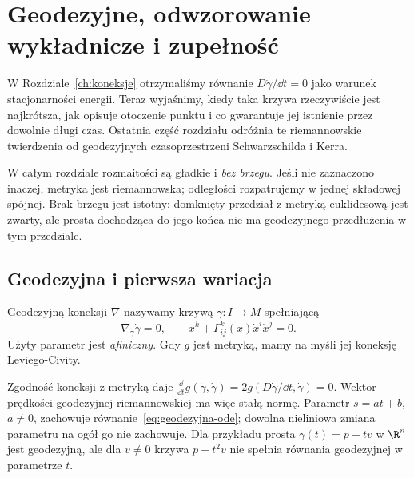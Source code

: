 \chapter{Geodezyjne, odwzorowanie wykładnicze i zupełność}
\label{ch:geodezyjne-exp}

W Rozdziale~\ref{ch:koneksje} otrzymaliśmy równanie
$D\dot\gamma/\dd t=0$ jako warunek stacjonarności
energii. Teraz wyjaśnimy, kiedy taka krzywa
rzeczywiście jest najkrótsza, jak opisuje otoczenie
punktu i co gwarantuje jej istnienie przez dowolnie
długi czas. Ostatnia część rozdziału odróżnia te
riemannowskie twierdzenia od geodezyjnych
czasoprzestrzeni Schwarzschilda i Kerra.

W całym rozdziale rozmaitości są gładkie i \emph{bez brzegu}.
Jeśli nie zaznaczono inaczej, metryka jest riemannowska;
odległości rozpatrujemy w jednej składowej spójnej.
Brak brzegu jest istotny: domknięty przedział z metryką
euklidesową jest zwarty, ale prosta dochodząca do jego
końca nie ma geodezyjnego przedłużenia w tym przedziale.

\section{Geodezyjna i pierwsza wariacja}
\label{sec:geodezyjna-pierwsza-wariacja}

\begin{definicja}[Geodezyjna]
\label{def:geodezyjna}
Geodezyjną koneksji $\nabla$ nazywamy krzywą
$\gamma:I\to M$ spełniającą
\begin{equation}\label{eq:geodezyjna-ode}
 \nabla_{\dot\gamma}\dot\gamma=0,
 \qquad
 \ddot x^k+\Gamma^k_{ij}(x)\dot x^i\dot x^j=0.
\end{equation}
Użyty parametr jest \emph{afiniczny}.
Gdy $g$ jest metryką, mamy na myśli jej
koneksję Leviego-Civity.
\end{definicja}

Zgodność koneksji z metryką daje
$\frac{\dd}{\dd t}g(\dot\gamma,\dot\gamma)
=2g(D\dot\gamma/\dd t,\dot\gamma)=0$.
Wektor prędkości geodezyjnej riemannowskiej ma więc stałą
normę. Parametr $s=at+b$, $a\ne0$,
zachowuje równanie~\eqref{eq:geodezyjna-ode};
dowolna nieliniowa zmiana parametru na ogół
go nie zachowuje. Dla przykładu prosta
$\gamma(t)=p+tv$ w $\R^n$ jest geodezyjną,
ale dla $v\ne0$ krzywa $p+t^2v$ nie spełnia równania geodezyjnej
w parametrze $t$.

